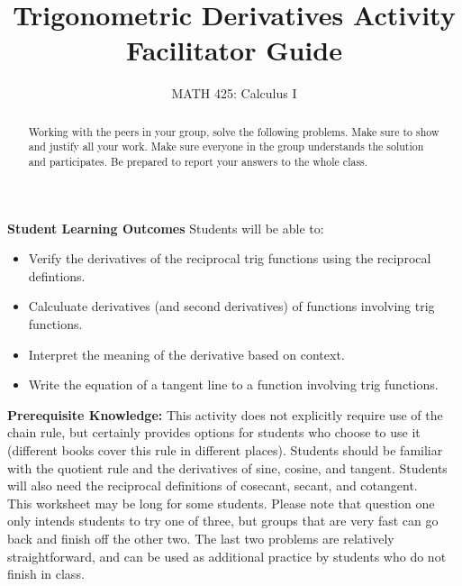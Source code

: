 \documentclass{ximera}
\title{Trigonometric Derivatives Activity Facilitator Guide}
\author{MATH 425: Calculus I}
\begin{document}
\begin{abstract}
    Working with the peers in your group, solve the following problems. Make sure to show and justify all your work. Make sure everyone in the group understands the solution and participates. Be prepared to report your answers to the whole class. 
\end{abstract}
\maketitle

\textbf{Student Learning Outcomes}
Students will be able to: 
    \begin{itemize}
        \item Verify the derivatives of the reciprocal trig functions using the reciprocal defintions.
        \item Calculuate derivatives (and second derivatives) of functions involving trig functions.
        \item Interpret the meaning of the derivative based on context.
        \item Write the equation of a tangent line to a function involving trig functions.
    \end{itemize}

\textbf{Prerequisite Knowledge:} This activity does not explicitly require use of the chain rule, but certainly provides options for students who choose to use it (different books cover this rule in different places).  Students should be familiar with the quotient rule and the derivatives of sine, cosine, and tangent.  Students will also need the reciprocal definitions of cosecant, secant, and cotangent.\\

This worksheet may be long for some students.  Please note that question one only intends students to try one of three, but groups that are very fast can go back and finish off the other two.  The last two problems are relatively straightforward, and can be used as additional practice by students who do not finish in class.  
\end{document}
